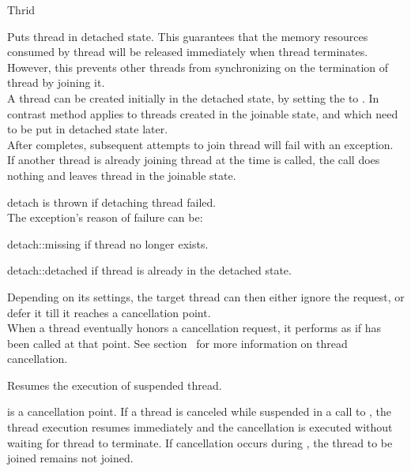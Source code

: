 \begin{classpage}{Thrid}
\begin{mandescription}
  Puts  thread in detached state.
  This guarantees that the memory resources consumed by  thread will be released immediately when  thread terminates. 
  However, this prevents other threads from synchronizing on the termination of  thread by joining it.
  \\
  A thread can be created initially in the detached state, by setting the  to .
  In contrast method  applies to threads created in the joinable state, and which need to be put in detached state later.
  \\
  After  completes, subsequent attempts to join  thread will fail with an exception.
  \\
  If another thread is already joining  thread at the time  is called, the call does nothing and leaves  thread in the joinable state.
  \begin{exception}
    \item[detach] is thrown if detaching  thread failed.
      \\
      The exception's reason of failure can be:
      \begin{exreason}
        \item[detach::missing] if  thread no longer exists.
        \item[detach::detached] if  thread is already in the detached state.
      \end{exreason}
  \end{exception}

  Depending on its settings, the target thread can then either ignore the request, or defer it till it reaches a cancellation point.
  \\
  When a thread eventually honors a cancellation request, it performs as if  has been called at that point. 
  See section~ for more information on thread cancellation.

  Resumes the execution of  suspended thread.
\end{mandescription}

 is a cancellation point. 
If a thread is canceled while suspended in a call to , the thread execution resumes immediately and the cancellation is executed without waiting for  thread to terminate. 
If cancellation occurs during , the thread to be joined remains not joined.

\end{classpage}
